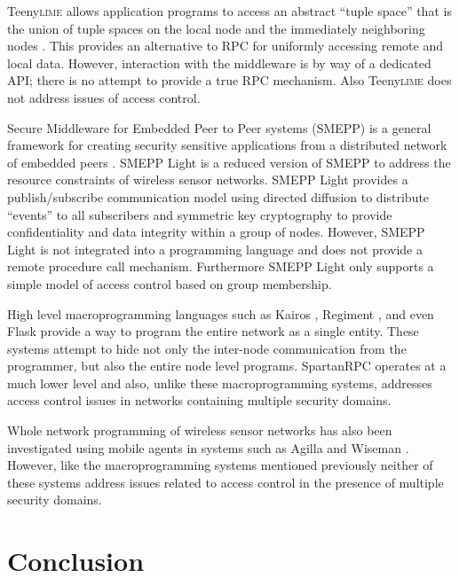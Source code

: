 Teeny\textsc{lime} allows application programs to access an abstract
``tuple space'' that is the union of tuple spaces on the local node and
the immediately neighboring nodes \cite{Costa:2007:PWS:1516124.1516153}.
This provides an alternative to RPC for uniformly accessing remote and
local data. However, interaction with the middleware is by way of a
dedicated API; there is no attempt to provide a true RPC mechanism. Also
Teeny\textsc{lime} does not address issues of access control.

Secure Middleware for Embedded Peer to Peer systems (SMEPP) is a general
framework for creating security sensitive applications from a
distributed network of embedded peers
\cite{Brogi:2008:SME:1363370.1363548}. SMEPP Light
\cite{Vairo:2008:SMW:1594978.1595054} is a reduced version of SMEPP to
address the resource constraints of wireless sensor networks. SMEPP
Light provides a publish/subscribe communication model using directed
diffusion to distribute ``events'' to all subscribers and symmetric key
cryptography to provide confidentiality and data integrity within a
group of nodes. However, SMEPP Light is not integrated into a
programming language and does not provide a remote procedure call
mechanism. Furthermore SMEPP Light only supports a simple model of
access control based on group membership.

High level macro\-programming languages such as Kairos
\cite{springerlink:10.1007/1150259312}, Regiment
\cite{Newton:2007:RMS:1236360.1236422}, and even Flask
\cite{Mainland-Flask-2008} provide a way to program the entire network
as a single entity. These systems attempt to hide not only the
inter-node communication from the programmer, but also the entire node
level programs. SpartanRPC operates at a much lower level and also,
unlike these macro\-programming systems, addresses access control issues
in networks containing multiple security domains.

Whole network programming of wireless sensor networks has also been
investigated using mobile agents in systems such as Agilla
\cite{Fok:2009:AMA:1552297.1552299} and Wiseman
\cite{Gonzalez-Valenzuela:2010:PMW:1891545.1891566}. However, like the
macro\-programming systems mentioned previously neither of these systems
address issues related to access control in the presence of multiple
security domains.

\section{Conclusion}
\label{section-conclusion}

